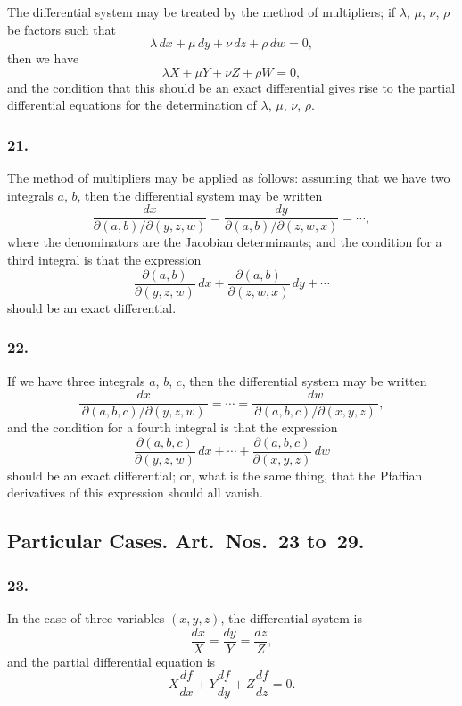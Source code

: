 \documentclass[12pt,a4paper]{article}
\theoremstyle{plain}
\begin{document}
The differential system may be treated by the method of multipliers; if $\lambda$, $\mu$, $\nu$, $\rho$ be factors such that
\[
\lambda\,dx + \mu\,dy + \nu\,dz + \rho\,dw = 0,
\]
then we have
\[
\lambda X + \mu Y + \nu Z + \rho W = 0,
\]
and the condition that this should be an exact differential gives rise to the partial differential equations for the determination of $\lambda$, $\mu$, $\nu$, $\rho$.

\newpage
\setcounter{page}{122}

\subsubsection*{21.}

The method of multipliers may be applied as follows: assuming that we have two integrals $a$, $b$, then the differential system may be written
\[
\frac{dx}{\partial(a, b)/\partial(y, z, w)} = \frac{dy}{\partial(a, b)/\partial(z, w, x)} = \cdots,
\]
where the denominators are the Jacobian determinants; and the condition for a third integral is that the expression
\[
\frac{\partial(a, b)}{\partial(y, z, w)}\,dx + \frac{\partial(a, b)}{\partial(z, w, x)}\,dy + \cdots
\]
should be an exact differential.

\subsubsection*{22.}

If we have three integrals $a$, $b$, $c$, then the differential system may be written
\[
\frac{dx}{\,\partial(a, b, c)/\partial(y, z, w)\,} = \cdots = \frac{dw}{\,\partial(a, b, c)/\partial(x, y, z)\,},
\]
and the condition for a fourth integral is that the expression
\[
\frac{\partial(a, b, c)}{\partial(y, z, w)}\,dx + \cdots + \frac{\partial(a, b, c)}{\partial(x, y, z)}\,dw
\]
should be an exact differential; or, what is the same thing, that the Pfaffian derivatives of this expression should all vanish.

\subsection*{Particular Cases. Art.~Nos.~23 to~29.}

\subsubsection*{23.}

In the case of three variables $(x, y, z)$, the differential system is
\[
\frac{dx}{X} = \frac{dy}{Y} = \frac{dz}{Z},
\]
and the partial differential equation is
\[
X\frac{df}{dx} + Y\frac{df}{dy} + Z\frac{df}{dz} = 0.
\]
\end{document}
